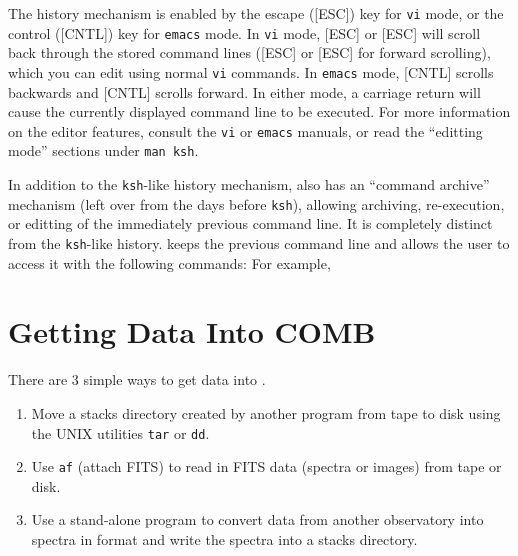 The history mechanism is enabled by the escape ([ESC]) key for 
{\tt vi} mode, or the control ([CNTL]) key for {\tt emacs} mode.
In {\tt vi} mode, [ESC] or [ESC]\thinspace{--} will scroll 
back through the stored command 
lines ([ESC] or [ESC]\thinspace{+} for forward scrolling), 
which you can edit using normal {\tt vi} commands. 
In {\tt emacs} mode, [CNTL] scrolls backwards and 
[CNTL] scrolls forward.
In either mode, a carriage return will cause the currently displayed command
line to be executed. For more information on the editor features, consult 
the {\tt vi} or {\tt emacs} manuals, or read the ``editting mode'' sections 
under {\tt man ksh}.

In addition to the {\tt ksh}-like history mechanism, \COMB also has
an ``command archive'' mechanism (left over from the days before {\tt ksh}), 
allowing archiving, re-execution, or editting of the immediately previous 
command line. It is completely distinct from the {\tt ksh}-like history.
\COMB keeps the previous command line and allows the user to access it with 
the following commands:
\noindent For example,

\section{Getting Data Into COMB}
\label{sec-gdic}

There are 3 simple ways to get data into \C.  
\begin{enumerate}
\item Move a stacks directory created by another \COMB program
     from tape to disk using the UNIX utilities {\tt tar} or {\tt dd}. 
\item Use {\tt af} (attach FITS) to read in FITS data (spectra or images) 
      from tape or disk. 
\item Use a stand-alone program to convert data from another observatory into
     spectra in \COMB format and write the spectra into a stacks directory.
\end{enumerate}

